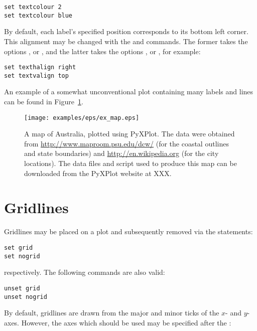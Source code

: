 \begin{verbatim}
set textcolour 2
set textcolour blue
\end{verbatim}

By default, each label's specified
position corresponds to its bottom left corner. This alignment may be changed
with the  and  commands. The
former takes the options ,  or ,
and the latter takes the options ,  or
, for example:

\begin{verbatim}
set texthalign right
set textvalign top
\end{verbatim}

An example of a somewhat unconventional plot containing many labels and lines can be found in Figure~\ref{fig:ex_map}.

\begin{figure}
\begin{center}
\texttt{[image: examples/eps/ex\_map.eps]}
\end{center}
\caption{A map of Australia, plotted using PyXPlot.  The data were obtained
from \protect\url{http://www.maproom.psu.edu/dcw/} (for the coastal outlines
and state boundaries) and \protect\url{http://en.wikipedia.org} (for the city
locations).  The data files and script used to produce this map can be
downloaded from the PyXPlot website at XXX.}
\label{fig:ex_map}
\end{figure}

\section{Gridlines}

Gridlines may be placed on a plot and subsequently removed via the statements:

\begin{verbatim}
set grid
set nogrid
\end{verbatim}

\noindent respectively. The following commands are also valid:

\begin{verbatim}
unset grid
unset nogrid
\end{verbatim}

\noindent By default, gridlines are drawn from the major and minor ticks of the
$x$- and $y$-axes. However, the axes which should be used may be specified
after the :

